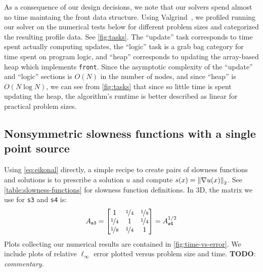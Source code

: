 \documentclass[sisc-eikonal.tex]{subfiles}
\begin{document}
As a consequence of our design decisions, we note that our solvers
spend almost no time maintaing the front data structure. Using
Valgrind~\cite{nethercote2007valgrind}, we profiled running our solver
on the numerical tests below for different problem sizes and
categorized the resulting profile data. See \cref{fig:tasks}. The
``update'' task corresponds to time spent actually computing updates,
the ``logic'' task is a grab bag category for time spent on program
logic, and ``heap'' corresponds to updating the array-based heap which
implements \texttt{front}. Since the asymptotic complexity of the
``update'' and ``logic'' sections is $O(N)$ in the number of nodes,
and since ``heap'' is $O(N \log N)$, we can see from \cref{fig:tasks}
that since so little time is spent updating the heap, the algorithm's
runtime is better described as linear for practical problem sizes.

\subsection[Single point source]{Nonsymmetric slowness functions with
  a single point source}\label{ssec:point-source-problems}

Using \cref{eq:eikonal} directly, a simple recipe to create pairs of
slowness functions and solutions is to prescribe a solution $u$ and
compute $s(x) = \left\|\nabla u(x)\right\|_2$. See
\cref{table:slowness-functions} for slowness function definitions. In
3D, the matrix we use for \texttt{s3} and \texttt{s4}
is:\begin{equation}
  A_{\texttt{s3}} = \begin{bmatrix}
    1 & \nicefrac{1}{4} & \nicefrac{1}{8} \\
    \nicefrac{1}{4} & 1 & \nicefrac{1}{4} \\
    \nicefrac{1}{8} & \nicefrac{1}{4} & 1
  \end{bmatrix} = A_{\texttt{s4}}^{1/2}
\end{equation}
Plots collecting our numerical results are contained in
\cref{fig:time-vs-error}. We include plots of relative
$\ell_\infty$ error plotted versus problem size and
time. \textbf{TODO}: \emph{commentary.}
\end{document}
